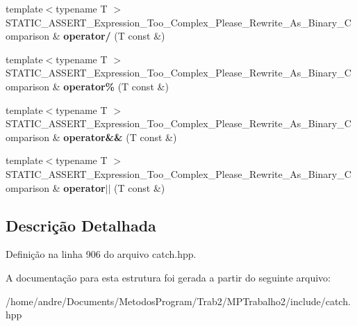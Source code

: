 \begin{DoxyCompactItemize}
\item 
{\footnotesize template$<$typename T $>$ }\\S\+T\+A\+T\+I\+C\+\_\+\+A\+S\+S\+E\+R\+T\+\_\+\+Expression\+\_\+\+Too\+\_\+\+Complex\+\_\+\+Please\+\_\+\+Rewrite\+\_\+\+As\+\_\+\+Binary\+\_\+\+Comparison \& {\bfseries operator/} (T const \&)\hypertarget{structCatch_1_1DecomposedExpression_a519d7e2363a92106e46371c9c04044a7}{}\label{structCatch_1_1DecomposedExpression_a519d7e2363a92106e46371c9c04044a7}

\item 
{\footnotesize template$<$typename T $>$ }\\S\+T\+A\+T\+I\+C\+\_\+\+A\+S\+S\+E\+R\+T\+\_\+\+Expression\+\_\+\+Too\+\_\+\+Complex\+\_\+\+Please\+\_\+\+Rewrite\+\_\+\+As\+\_\+\+Binary\+\_\+\+Comparison \& {\bfseries operator\%} (T const \&)\hypertarget{structCatch_1_1DecomposedExpression_a6584335aadaee847c9d06ca8f13a4477}{}\label{structCatch_1_1DecomposedExpression_a6584335aadaee847c9d06ca8f13a4477}

\item 
{\footnotesize template$<$typename T $>$ }\\S\+T\+A\+T\+I\+C\+\_\+\+A\+S\+S\+E\+R\+T\+\_\+\+Expression\+\_\+\+Too\+\_\+\+Complex\+\_\+\+Please\+\_\+\+Rewrite\+\_\+\+As\+\_\+\+Binary\+\_\+\+Comparison \& {\bfseries operator\&\&} (T const \&)\hypertarget{structCatch_1_1DecomposedExpression_a63cc26b2f8bce9d4cdb5e64ef6344d7e}{}\label{structCatch_1_1DecomposedExpression_a63cc26b2f8bce9d4cdb5e64ef6344d7e}

\item 
{\footnotesize template$<$typename T $>$ }\\S\+T\+A\+T\+I\+C\+\_\+\+A\+S\+S\+E\+R\+T\+\_\+\+Expression\+\_\+\+Too\+\_\+\+Complex\+\_\+\+Please\+\_\+\+Rewrite\+\_\+\+As\+\_\+\+Binary\+\_\+\+Comparison \& {\bfseries operator$\vert$$\vert$} (T const \&)\hypertarget{structCatch_1_1DecomposedExpression_ab4800d277290088fea9c594cfdd4f1c7}{}\label{structCatch_1_1DecomposedExpression_ab4800d277290088fea9c594cfdd4f1c7}

\end{DoxyCompactItemize}


\subsection{Descrição Detalhada}


Definição na linha 906 do arquivo catch.\+hpp.



A documentação para esta estrutura foi gerada a partir do seguinte arquivo\+:\begin{DoxyCompactItemize}
\item 
/home/andre/\+Documents/\+Metodos\+Program/\+Trab2/\+M\+P\+Trabalho2/include/catch.\+hpp\end{DoxyCompactItemize}
